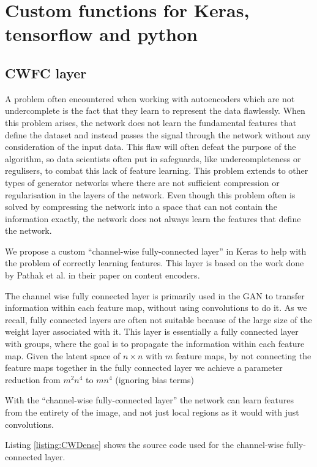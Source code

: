     
\section{Custom functions for Keras, tensorflow and python}
\subsection{CWFC layer}
A problem often encountered when working with autoencoders which are not undercomplete is the fact that they learn to represent the data flawlessly. \cite{OvercompleteAE} 
When this problem arises, the network does not learn the fundamental features that define the dataset and instead passes the signal through the network without any consideration of the input data.
This flaw will often defeat the purpose of the algorithm, so data scientists often put in safeguards, like undercompleteness or regulisers, to combat this lack of feature learning. 
This problem extends to other types of generator networks where there are not sufficient compression or regularisation in the layers of the network.
Even though this problem often is solved by compressing the network into a space that can not contain the information exactly, the network does not always learn the features that define the network. 

We propose a custom ``channel-wise fully-connected layer'' in Keras to help with the problem of correctly learning features. This layer is based on the work done by Pathak et al. in their paper on content encoders\cite{Pathak_2016}.

The channel wise fully connected layer is primarily used in the GAN to transfer information within each feature map, without using convolutions to do it. As we recall, fully connected layers are often not suitable because of the large size of the weight layer associated with it. This layer is essentially a fully connected layer with groups, where the goal is to propagate the information within each feature map.
Given the latent space of $n \times n$ with $m$ feature maps, by not connecting the feature maps together in the fully connected layer we achieve a parameter reduction from $m^2n^4$ to $mn^4$ (ignoring bias terms) \cite{Pathak_2016}

With the ``channel-wise fully-connected layer'' the network can learn features from the entirety of the image, and not just local regions as it would with just convolutions. 

Listing \ref{listing:CWDense} shows the source code used for the channel-wise fully-connected layer.

